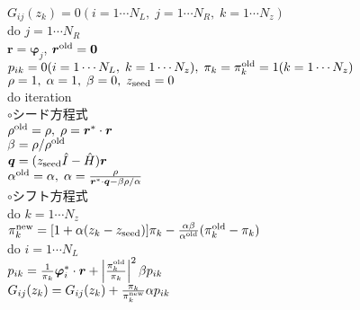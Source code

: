\documentclass[12pt,titlepage]{jarticle}
\begin{document}
\noindent
$G_{i j}(z_k) = 0 (i=1 \cdots N_L,\; j = 1 \cdots N_R,\; k=1 \cdots N_z)$
\\
do $j = 1 \cdots N_R$
\\\hspace{0.5cm}
${\boldsymbol r} = {\boldsymbol \varphi_j}$, 
${\boldsymbol r}^{\rm old} = {\bf 0}$
\\\hspace{0.5cm}
$p_{i k} = 0(i=1 \cdots N_L,\; k=1 \cdots N_z),\; \pi_k=\pi_k^{\rm old} = 1(k=1 \cdots N_z)$ 
\\\hspace{0.5cm}
$\rho = 1,\; \alpha = 1,\; \beta=0,\; z_{\rm seed}=0$ 
\\\hspace{0.5cm}
do iteration
\\\hspace{1.0cm}
$\circ$シード方程式
\\\hspace{1.0cm}
$\rho^{\rm old} = \rho,\; \rho = {\boldsymbol r}^* \cdot {\boldsymbol r}$
\\\hspace{1.0cm}
$\beta = \rho / \rho^{\rm old}$
\\\hspace{1.0cm}
${\boldsymbol q} = (z_{\rm seed} {\hat I} - {\hat H}){\boldsymbol r}$
\\\hspace{1.0cm}
$\alpha^{\rm old} = \alpha,\; 
\alpha = \frac{\rho}{{\boldsymbol r}^* \cdot {\boldsymbol q} - \beta \rho / \alpha }$
\\\hspace{1.0cm}
$\circ$シフト方程式
\\\hspace{1.0cm}
do $k = 1 \cdots N_z$
\\\hspace{1.5cm}
$\pi_k^{\rm new} = [1+\alpha(z_k-z_{\rm seed})]\pi_k - \frac{\alpha \beta}{\alpha^{\rm old}}(\pi_k^{\rm old} - \pi_k)$
\\\hspace{1.5cm}
do $i = 1 \cdots N_L$
\\\hspace{2.0cm}
$p_{i k} = \frac{1}{\pi_k} {\boldsymbol \varphi}_i^* \cdot {\boldsymbol r} + 
\left|\frac{\pi^{\rm old}_k}{\pi_k } \right|^2 \beta p_{i k}$
\\\hspace{2.0cm}
$G_{i j}(z_k) = G_{i j}(z_k) + \frac{\pi_k}{\pi_k^{\rm new}} \alpha p_{i k}$
\\\hspace{1.5cm}
\end{document}
